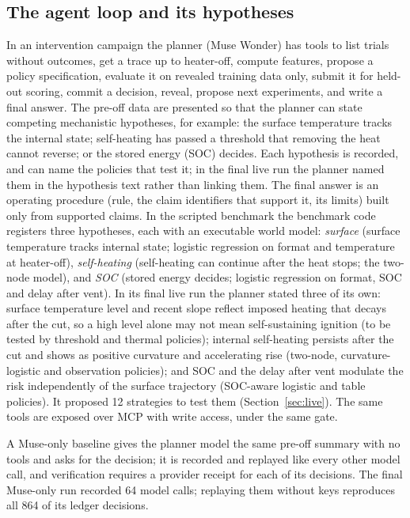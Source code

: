 \documentclass[11pt]{article}
\begin{document}
\subsection{The agent loop and its hypotheses}
In an intervention campaign the planner (Muse Wonder) has tools to list trials without outcomes, get a trace up to
heater-off, compute features, propose a policy specification, evaluate it on revealed training data only, submit it
for held-out scoring, commit a decision, reveal, propose next experiments, and write a final answer. The pre-off data
are presented so that the planner can state competing mechanistic hypotheses, for example: the surface temperature
tracks the internal state; self-heating has passed a threshold that removing the heat cannot reverse; or the stored
energy (SOC) decides. Each hypothesis is recorded, and can name the policies that test it; in the final live run the planner named
them in the hypothesis text rather than linking them. The final answer is an operating
procedure (rule, the claim identifiers that support it, its limits) built only from supported claims. In the scripted
benchmark the benchmark code registers three hypotheses, each with an executable world model: \emph{surface} (surface
temperature tracks internal state; logistic regression on format and temperature at heater-off), \emph{self-heating}
(self-heating can continue after the heat stops; the two-node model), and \emph{SOC} (stored energy decides; logistic
regression on format, SOC and delay after vent). In its final live run the planner stated three of its own: surface temperature level and recent
slope reflect imposed heating that decays after the cut, so a high level alone may not mean self-sustaining ignition
(to be tested by threshold and thermal policies); internal self-heating persists after the cut and shows as positive
curvature and accelerating rise (two-node, curvature-logistic and observation policies); and SOC and the delay after
vent modulate the risk independently of the surface trajectory (SOC-aware logistic and table policies). It proposed
12 strategies to test them (Section~\ref{sec:live}). The same tools are exposed over MCP with write
access, under the same gate.

A Muse-only baseline gives the planner model the same pre-off summary with no tools and asks for the decision; it is
recorded and replayed like every other model call, and verification requires a provider receipt for each of its
decisions. The final Muse-only run recorded 64 model calls; replaying them without keys reproduces all 864 of its
ledger decisions.
\end{document}
